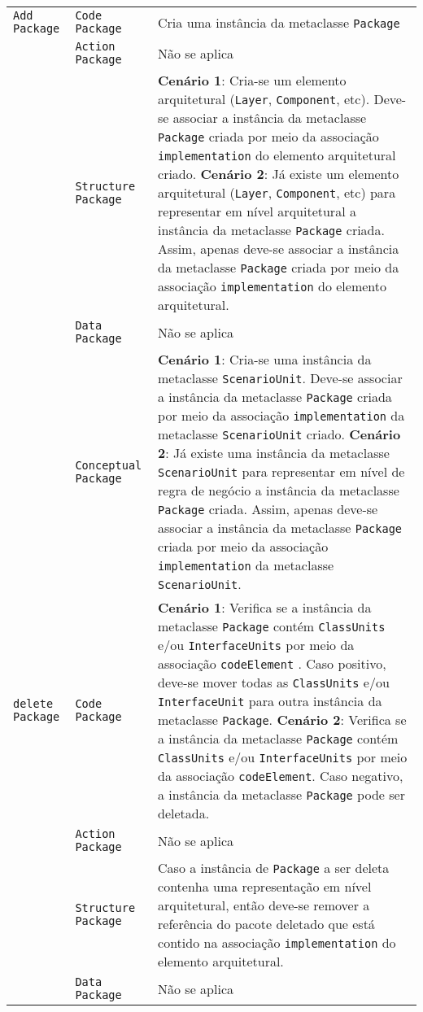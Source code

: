 \begin{longtable}{ | m{1.9cm} | m{3.57cm}| m{9.3cm} | }
 \texttt{Add} \texttt{Package} & \texttt{Code Package} & Cria uma instância da metaclasse \texttt{Package}\tabularnewline
\cline{2-3} 
\cline{2-3} 
 & \texttt{Action Package} & Não se aplica \tabularnewline
 \cline{2-3} 
 & \texttt{Structure Package} & \textbf{Cenário 1}: Cria-se um elemento arquitetural (\texttt{Layer}, \texttt{Component}, etc). Deve-se associar a instância da metaclasse \texttt{Package} criada por meio da associação  \texttt{implementation} do elemento arquitetural criado. \textbf{Cenário 2}: Já existe um elemento arquitetural (\texttt{Layer}, \texttt{Component}, etc) para representar em nível arquitetural a instância da metaclasse \texttt{Package} criada. Assim, apenas deve-se associar a instância da metaclasse \texttt{Package} criada por meio da associação \texttt{implementation} do elemento arquitetural. \tabularnewline
\cline{2-3} 
 & \texttt{Data Package} & Não se aplica \tabularnewline
\cline{2-3} 
 & \texttt{Conceptual Package} & \textbf{Cenário 1}: Cria-se uma instância da metaclasse \texttt{ScenarioUnit}. Deve-se associar a instância da metaclasse \texttt{Package} criada por meio da associação \texttt{implementation} da metaclasse \texttt{ScenarioUnit} criado. \textbf{Cenário 2}: Já existe uma instância da metaclasse \texttt{ScenarioUnit} para representar em nível de regra de negócio a instância da metaclasse \texttt{Package} criada. Assim, apenas deve-se associar a instância da metaclasse \texttt{Package} criada por meio da associação \texttt{implementation} da metaclasse \texttt{ScenarioUnit}. \tabularnewline
\hline 
 \texttt{delete} \texttt{Package} & \texttt{Code Package} & \textbf{Cenário 1}: Verifica se a instância da metaclasse \texttt{Package} contém \texttt{ClassUnits} e/ou \texttt{InterfaceUnits}  por meio da associação \texttt{codeElement} . Caso positivo, deve-se mover todas as \texttt{ClassUnits} e/ou \texttt{InterfaceUnit} para outra instância da metaclasse \texttt{Package}. \textbf{Cenário 2}: Verifica se a instância da metaclasse \texttt{Package} contém \texttt{ClassUnits} e/ou \texttt{InterfaceUnits}  por meio da associação \texttt{codeElement}. Caso negativo, a instância da metaclasse \texttt{Package} pode ser deletada.\tabularnewline
\cline{2-3} 
& \texttt{Action Package} & Não se aplica \tabularnewline
\cline{2-3}
& \texttt{Structure Package} & Caso a instância de \texttt{Package} a ser deleta contenha uma representação em nível arquitetural, então deve-se remover a referência do pacote deletado que está contido na associação \texttt{implementation} do elemento arquitetural. \tabularnewline
\cline{2-3}
& \texttt{Data Package} & Não se aplica \tabularnewline

\end{longtable}

